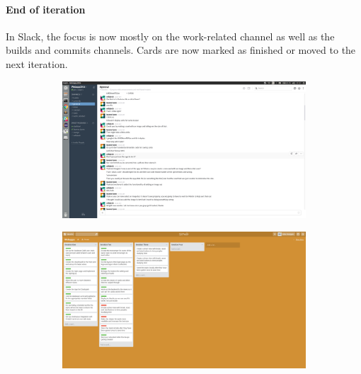 \documentclass[a4wide, 10pt]{article}
\begin{document}
\paragraph{End of iteration}
In Slack, the focus is now mostly on the work-related channel as well as the builds and commits channels.  Cards are now marked as finished or moved to the next iteration.
\begin{figure}[h]
\centering
\begin{subfigure}{.5\textwidth}
  \centering
  	\includegraphics[scale=0.1]{slackend.png} 
  \label{fig:sub1}
\end{subfigure}%
\begin{subfigure}{.5\textwidth}
  \centering
  	\includegraphics[scale=0.1]{iterationlast.png}  
  \label{fig:sub2}
\end{subfigure}
\label{fig:test}
\end{figure}
\end{document}
